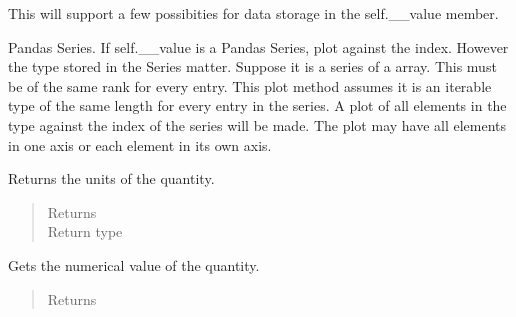 \documentclass[letterpaper,10pt,openany,oneside,english]{sphinxmanual}
\begin{document}
\begin{fulllineitems}
\begin{fulllineitems}
\begin{quote}
\begin{description}
\end{description}\end{quote}

\end{fulllineitems}


\begin{fulllineitems}
\label{\detokenize{support_rst/quantity:quantity.Quantity.plot}}
This will support a few possibities for data storage in the self.\_\_value
member.

Pandas Series. If self.\_\_value is a Pandas Series, plot against the index.
However the type stored in the Series matter. Suppose it is a series
of a  array. This must be of the same rank for every entry.
This plot method assumes it is an iterable type of the same length for every
entry in the series. A plot of all elements in the type against the index of
the series will be made. The plot may have all elements in one axis or
each element in its own axis.

\end{fulllineitems}


\begin{fulllineitems}
\label{\detokenize{support_rst/quantity:quantity.Quantity.unit}}
Returns the units of the quantity.
\begin{quote}\begin{description}
\item[{Returns}] \leavevmode
{}

\item[{Return type}] \leavevmode
{}

\end{description}\end{quote}

\end{fulllineitems}


\begin{fulllineitems}
\label{\detokenize{support_rst/quantity:quantity.Quantity.value}}
Gets the numerical value of the quantity.
\begin{quote}\begin{description}
\item[{Returns}] \leavevmode
{}


\end{description}
\end{quote}
\end{fulllineitems}
\end{fulllineitems}
\end{document}
